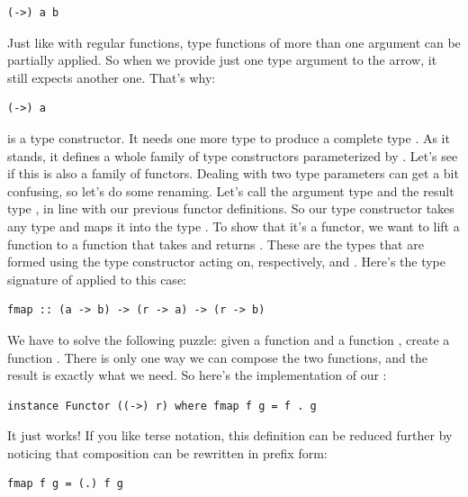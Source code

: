 \begin{verbatim}
(->) a b
\end{verbatim}

Just like with regular functions, type functions of more than one
argument can be partially applied. So when we provide just one type
argument to the arrow, it still expects another one. That's why:

\begin{verbatim}
(->) a
\end{verbatim}

is a type constructor. It needs one more type  to produce a
complete type . As it stands, it defines a
whole family of type constructors parameterized by . Let's see
if this is also a family of functors. Dealing with two type parameters
can get a bit confusing, so let's do some renaming. Let's call the
argument type  and the result type , in line with
our previous functor definitions. So our type constructor takes any type
 and maps it into the type . To show
that it's a functor, we want to lift a function
 to a function that takes
 and returns . These
are the types that are formed using the type constructor
 acting on, respectively,  and
. Here's the type signature of  applied to this
case:

\begin{verbatim}
fmap :: (a -> b) -> (r -> a) -> (r -> b)
\end{verbatim}

We have to solve the following puzzle: given a function
 and a function
, create a function
. There is only one way we can compose the two
functions, and the result is exactly what we need. So here's the
implementation of our :

\begin{verbatim}
instance Functor ((->) r) where fmap f g = f . g
\end{verbatim}

It just works! If you like terse notation, this definition can be
reduced further by noticing that composition can be rewritten in prefix
form:

\begin{verbatim}
fmap f g = (.) f g
\end{verbatim}

